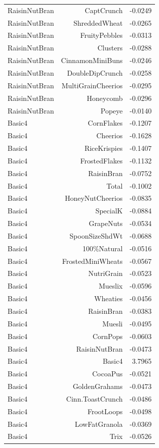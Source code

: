 \begin{longtable}{@{}lrr@{}}
RaisinNutBran & CaptCrunch & -0.0249 \\
RaisinNutBran & ShreddedWheat & -0.0265 \\
RaisinNutBran & FruityPebbles & -0.0313 \\
RaisinNutBran & Clusters & -0.0288 \\
RaisinNutBran & CinnamonMiniBuns & -0.0246 \\
RaisinNutBran & DoubleDipCrunch & -0.0258 \\
RaisinNutBran & MultiGrainCheerios & -0.0295 \\
RaisinNutBran & Honeycomb & -0.0296 \\
RaisinNutBran & Popeye & -0.0140 \\
Basic4 & CornFlakes & -0.1207 \\
Basic4 & Cheerios & -0.1628 \\
Basic4 & RiceKrispies & -0.1407 \\
Basic4 & FrostedFlakes & -0.1132 \\
Basic4 & RaisinBran & -0.0752 \\
Basic4 & Total & -0.1002 \\
Basic4 & HoneyNutCheerios & -0.0835 \\
Basic4 & SpecialK & -0.0884 \\
Basic4 & GrapeNuts & -0.0534 \\
Basic4 & SpoonSizeShdWt & -0.0688 \\
Basic4 & 100\%Natural & -0.0516 \\
Basic4 & FrostedMiniWheats & -0.0567 \\
Basic4 & NutriGrain & -0.0523 \\
Basic4 & Mueslix & -0.0596 \\
Basic4 & Wheaties & -0.0456 \\
Basic4 & RaisinBran & -0.0383 \\
Basic4 & Muesli & -0.0495 \\
Basic4 & CornPops & -0.0603 \\
Basic4 & RaisinNutBran & -0.0473 \\
Basic4 & Basic4 & 3.7965 \\
Basic4 & CocoaPus & -0.0521 \\
Basic4 & GoldenGrahams & -0.0473 \\
Basic4 & Cinn.ToastCrunch & -0.0486 \\
Basic4 & FrootLoops & -0.0498 \\
Basic4 & LowFatGranola & -0.0369 \\
Basic4 & Trix & -0.0526 \\

\end{longtable}
